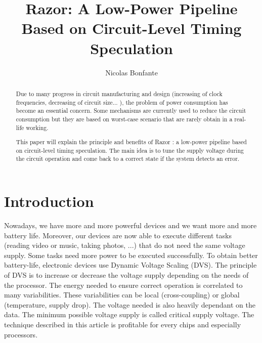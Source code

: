 \documentclass[fleqn,envcountsame,runningheads,10pt,a4paper]{llncs}
\begin{document}
\title{Razor: A Low-Power Pipeline Based on Circuit-Level Timing Speculation}
\author{Nicolas Bonfante}

\maketitle

\begin{abstract}
Due to many progress in circuit manufacturing and design (increasing of clock frequencies, decreasing of circuit size... ), the problem of power consumption has become an essential concern. Some mechanisms are currently used to reduce the circuit consumption but they are based on worst-case scenario that are rarely obtain in a real-life working. 

This paper will explain the principle and benefits of Razor : a low-power pipeline based on circuit-level timing speculation. The main idea is to tune the supply voltage during the circuit operation and come back to a correct state if the system detects an error.
\end{abstract}


\section{Introduction}
Nowadays, we have more and more powerful devices and we want more and more battery life. Moreover, our devices are now able to execute different tasks (reading video or music, taking photos, ...) that do not need the same voltage supply. Some tasks need more power to be executed successfully. To obtain better battery-life, electronic devices use Dynamic Voltage Scaling (DVS)\cite{Pering:1998}. The principle of DVS is to increase or decrease the voltage supply depending on the needs of the processor. The energy needed to ensure correct operation is correlated to many variabilities. These variabilities can be local (cross-coupling) or global (temperature, supply drop). The voltage needed is also heavily dependant on the data. The minimum possible voltage supply is called critical supply voltage. The technique described in this article is profitable for every chips and especially processors.
\end{document}

